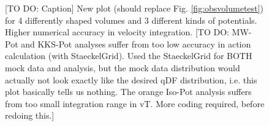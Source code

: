 \begin{figure}
\caption{[TO DO: Caption] New plot (should replace Fig. \ref{fig:obsvolumetest}) for 4 differently shaped volumes and 3 different kinds of potentials. Higher numerical accuracy in velocity integration. [TO DO: MW-Pot and KKS-Pot analyses suffer from too low accuracy in action calculation (with StaeckelGrid). Used the StaeckelGrid for BOTH mock data and analysis, but the mock data distribution would actually not look exactly like the desired qDF distribution, i.e. this plot basically tells us nothing. The orange Iso-Pot analysis suffers from too small integration range in vT. More coding required, before redoing this.]}
\end{figure}




